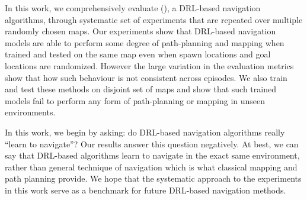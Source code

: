 In this work, we comprehensively evaluate  \NavAiiiCDiDiiL{} (\cite{MiPaViICLR2017}), a DRL-based navigation algorithms, through systematic set of experiments that
are repeated over multiple randomly chosen maps.
Our experiments show that DRL-based navigation models are able to perform some degree of path-planning and mapping when trained and tested on the same map even when spawn locations and goal locations are randomized. 
However the large variation in the evaluation metrics show that how such behaviour is not consistent across episodes. 
We also train and test these methods on disjoint set of maps and show that such trained models fail to perform any form of path-planning or mapping in unseen environments.

In this work, we begin by asking: do DRL-based navigation algorithms really ``learn to navigate''?
Our results answer this question negatively. At best, we can say that DRL-based algorithms learn to navigate in the exact same environment, rather than general technique of navigation which is what classical mapping and path planning provide.
We hope that the systematic approach to the experiments in this work serve as a benchmark for future DRL-based navigation methods.


